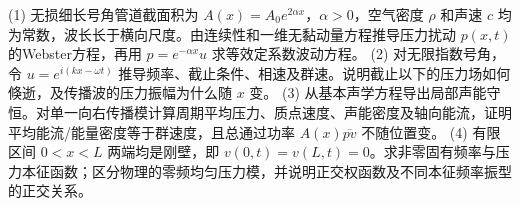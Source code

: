 (1) 无损细长号角管道截面积为 \(A(x)=A_0 e^{2\alpha x}\)，\(\alpha>0\)，空气密度 \(\rho\) 和声速 \(c\) 均为常数，波长长于横向尺度。由连续性和一维无黏动量方程推导压力扰动 \(p(x,t)\) 的Webster方程，再用 \(p=e^{-\alpha x}u\) 求等效定系数波动方程。
(2) 对无限指数号角，令 \(u=e^{i(kx-\omega t)}\) 推导频率、截止条件、相速及群速。说明截止以下的压力场如何倏逝，及传播波的压力振幅为什么随 \(x\) 变。
(3) 从基本声学方程导出局部声能守恒。对单一向右传播模计算周期平均压力、质点速度、声能密度及轴向能流，证明平均能流/能量密度等于群速度，且总通过功率 \(A(x)\overline{pv}\) 不随位置变。
(4) 有限区间 \(0<x<L\) 两端均是刚壁，即 \(v(0,t)=v(L,t)=0\)。求非零固有频率与压力本征函数；区分物理的零频均匀压力模，并说明正交权函数及不同本征频率振型的正交关系。
